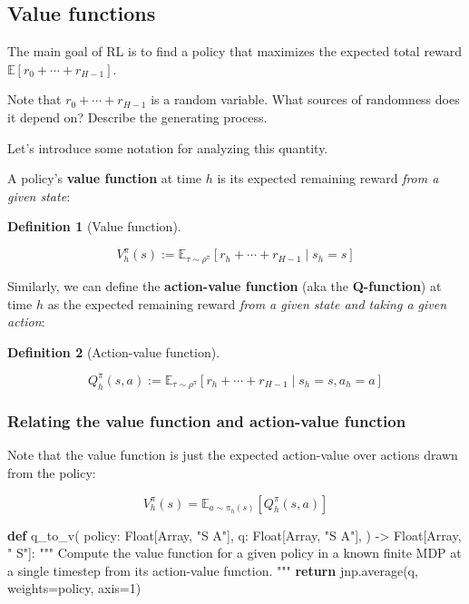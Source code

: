 \documentclass[
  letterpaper,
  DIV=11,
  numbers=noendperiod]{scrreprt}
\newenvironment{Shaded}{\begin{snugshade}}{\end{snugshade}}
\newcommand{\CommentTok}[1]{\textcolor[rgb]{0.37,0.37,0.37}{#1}}
\newcommand{\ControlFlowTok}[1]{\textcolor[rgb]{0.00,0.23,0.31}{\textbf{#1}}}
\newcommand{\DecValTok}[1]{\textcolor[rgb]{0.68,0.00,0.00}{#1}}
\newcommand{\KeywordTok}[1]{\textcolor[rgb]{0.00,0.23,0.31}{\textbf{#1}}}
\newcommand{\NormalTok}[1]{\textcolor[rgb]{0.00,0.23,0.31}{#1}}
\newcommand{\OperatorTok}[1]{\textcolor[rgb]{0.37,0.37,0.37}{#1}}
\newcommand{\StringTok}[1]{\textcolor[rgb]{0.13,0.47,0.30}{#1}}
\theoremstyle{plain}
\theoremstyle{plain}
\theoremstyle{definition}
\theoremstyle{definition}
\newtheorem{definition}{Definition}[chapter]
\theoremstyle{remark}
\begin{document}
\subsection{Value functions}\label{value-functions}

The main goal of RL is to find a policy that maximizes the expected
total reward \(\mathbb{E}[r_0 + \cdots + r_{H-1}]\).

Note that \(r_0 + \cdots + r_{H-1}\) is a random variable. What sources
of randomness does it depend on? Describe the generating process.

Let's introduce some notation for analyzing this quantity.

A policy's \textbf{value function} at time \(h\) is its expected
remaining reward \emph{from a given state}:

\begin{definition}[Value
function]\protect\hypertarget{def-value}{}\label{def-value}

\[V_h^\pi(s) := \mathbb{E}_{\tau \sim \rho^\pi} [r_h+ \cdots + r_{H-1} \mid s_h= s]\]

\end{definition}

Similarly, we can define the \textbf{action-value function} (aka the
\textbf{Q-function}) at time \(h\) as the expected remaining reward
\emph{from a given state and taking a given action}:

\begin{definition}[Action-value
function]\protect\hypertarget{def-action_value}{}\label{def-action_value}

\[Q_h^\pi(s, a) := \mathbb{E}_{\tau \sim \rho^\pi} [r_h+ \cdots + r_{H-1} \mid s_h= s, a_h= a]\]

\end{definition}

\subsubsection{Relating the value function and action-value
function}\label{relating-the-value-function-and-action-value-function}

Note that the value function is just the expected action-value over
actions drawn from the policy:

\[V_h^\pi(s) = \mathbb{E}_{a \sim \pi_h(s)} [Q_h^\pi(s, a)]\]

\begin{Shaded}
\begin{Highlighting}[]
\KeywordTok{def}\NormalTok{ q\_to\_v(}
\NormalTok{    policy: Float[Array, }\StringTok{"S A"}\NormalTok{],}
\NormalTok{    q: Float[Array, }\StringTok{"S A"}\NormalTok{],}
\NormalTok{) }\OperatorTok{{-}\textgreater{}}\NormalTok{ Float[Array, }\StringTok{" S"}\NormalTok{]:}
    \CommentTok{"""}
\CommentTok{    Compute the value function for a given policy in a known finite MDP}
\CommentTok{    at a single timestep from its action{-}value function.}
\CommentTok{    """}
    \ControlFlowTok{return}\NormalTok{ jnp.average(q, weights}\OperatorTok{=}\NormalTok{policy, axis}\OperatorTok{=}\DecValTok{1}\NormalTok{)}
\end{Highlighting}
\end{Shaded}
\end{document}

